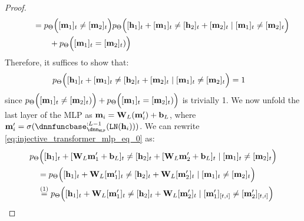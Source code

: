 \begin{proof}
\begin{subequations}
\begin{align}
        &\qquad= p_{\Theta}\Big([\mathbf{m}_{1}]_t\neq[\mathbf{m}_{2}]_t\Big)p_{\Theta}\Big([\mathbf{h}_1]_t+[\mathbf{m}_{1}]_t\neq[\mathbf{h}_2]_t+[\mathbf{m}_{2}]_t\mid [\mathbf{m}_{1}]_t\neq[\mathbf{m}_{2}]_t\Big) \\
        &\qquad\qquad+p_{\Theta}\Big([\mathbf{m}_{1}]_t=[\mathbf{m}_{2}]_t)\Big) \nonumber
    \end{align}
    \end{subequations}
    Therefore, it suffices to show that:
    \begin{align}
        &p_{\Theta}\Big([\mathbf{h}_1]_t+[\mathbf{m}_{1}]_t\neq[\mathbf{h}_2]_t+[\mathbf{m}_{2}]_t\mid  [\mathbf{m}_{1}]_t\neq[\mathbf{m}_{2}]_t\Big)=1\label{eq:injective_transformer_mlp_eq_0}
    \end{align}
    since $p_{\Theta}\Big([\mathbf{m}_{1}]_t\neq[\mathbf{m}_{2}]_t)\Big) + p_{\Theta}\Big([\mathbf{m}_{1}]_t=[\mathbf{m}_{2}]_t)\Big)$ is trivially 1.
    We now unfold the last layer of the MLP as $\mathbf{m}_{i}=\mathbf{W}_{L}(\mathbf{m}'_{i})+\mathbf{b}_{L}$, where $\MLP'_{i}=\nonlinearity(\dnnmlpfunclayer{:\nlayers-1}(\layerNorm(\hiddenstates_i)))$. We can rewrite \cref{eq:injective_transformer_mlp_eq_0} as:
    \newcommand{\parameters}{\theta}
    \begin{subequations}
    \begin{align}\label{eq:injective_transformer_mlp_eq_1}
        &\prob_{\Parameters}\Big([\hiddenstates_1]_\tokenposition+[\mlpweights_{\nlayers}\MLP'_1+\mlpbias_{\nlayers}]_\tokenposition\neq[\hiddenstates_2]_\tokenposition+[\mlpweights_{\nlayers}\MLP'_{2}+\mlpbias_{\nlayers}]_\tokenposition \mid [\MLP_{1}]_\tokenposition\neq[\MLP_{2}]_\tokenposition\Big) \nonumber\\
        &\quad= \prob_{\Parameters}\Big([\hiddenstates_1]_\tokenposition+\mlpweights_{\nlayers}[\MLP'_{1}]_\tokenposition\neq[\hiddenstates_2]_\tokenposition+\mlpweights_{\nlayers}[\MLP'_{2}]_\tokenposition \mid [\MLP_{1}]_\tokenposition\neq[\MLP_{2}]_\tokenposition\Big)  \\
        &\quad\stackrel{(1)}{=} \prob_{\Parameters}\Big([\hiddenstates_1]_\tokenposition+\mlpweights_{\nlayers}[\MLP'_{1}]_\tokenposition\neq[\hiddenstates_2]_\tokenposition+\mlpweights_{\nlayers}[\MLP'_{2}]_\tokenposition\mid [\MLP'_{1}]_{[\tokenposition,i]}\neq[\MLP'_{2}]_{[\tokenposition,i]}\Big) \\

\end{align}
\end{subequations}
\end{proof}
